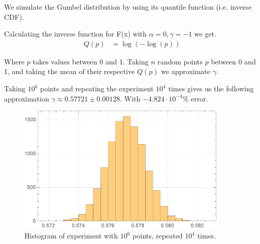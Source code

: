 \documentclass[12pt]{article}
\numberwithin{equation}{section}
\begin{document}
We simulate the Gumbel distribution by using its quantile function (i.e. inverse CDF).
\par Calculating the inverse function for F(x) with $\alpha=0, \gamma=-1$ we get.
\begin{align}
   Q(p)&= \log \left(- \log \left(p\right)\right)
\end{align}
\par Where $p$ takes values between 0 and 1. Taking $n$ random points $p$ between 0 and 1, and taking the mean of their respective $Q(p)$ we approximate $\gamma$.
\par Taking $10^6$ points and repeating the experiment $10^4$ times gives us the following approximation $\gamma \approx 0.57721 \pm 0.00128$. With $-4.824 \cdot 10^{-4} \%$ error.
\begin{figure}[!htb]
    \centering
    \includegraphics[width=10cm]{Images/repeatedgamma.png}
    \caption{Histogram of experiment with $10^6$ points, repeated $10^4$ times.}
    \label{fig:repeatedgamma}
\end{figure}
\end{document}
